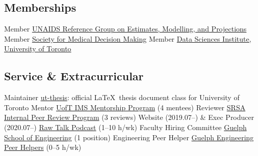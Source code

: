 \subsection{Memberships}
  {Member}
  {\href{https://epidem.org}{UNAIDS Reference Group on Estimates, Modelling, and Projections}}
  {Member}
  {\href{https://smdm.org/}{Society for Medical Decision Making}}
  {Member}
  {\href{https://datasciences.utoronto.ca/}{Data Sciences Institute, University of Toronto}}
\subsection{Service \& Extracurricular}
  {Maintainer}
  {\href{https://www.ctan.org/pkg/ut-thesis}{ut-thesis}: official \LaTeX\ thesis document class for University of Toronto}
  {Mentor} %
  {\href{https://ims.utoronto.ca/ims-p2p-mentorship}{UofT IMS Mentorship Program} (4 mentees)}
  {Reviewer} %
  {\href{https://research.unityhealth.to/future-students-trainees/st-michaels-hospital-research-student-association}{SRSA Internal Peer Review Program} (3 reviews)}
  {Website \textnormal{(2019.07--)} \& Exec Producer \textnormal{(2020.07--)}}
  {\href{https://www.rawtalkpodcast.com}{Raw Talk Podcast} (1--10 h/wk)}
  {Faculty Hiring Committee}
  {\href{https://www.uoguelph.ca/engineering}{Guelph School of Engineering} (1 position)}
  {Engineering Peer Helper}
  {\href{https://www.uoguelph.ca/engineering/content/current/peer-helper}{Guelph Engineering Peer Helpers} (0--5 h/wk)}
